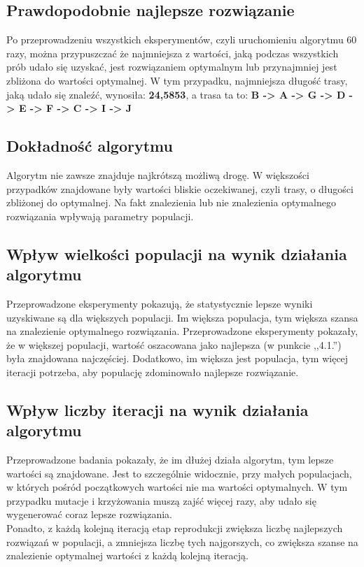 \documentclass[a4paper,11pt]{article}
\begin{document}
		\subsection{Prawdopodobnie najlepsze rozwiązanie}
		Po przeprowadzeniu wszystkich eksperymentów, czyli uruchomieniu algorytmu 60 razy, można przypuszczać że najmniejsza z wartości, jaką podczas wszystkich prób udało się uzyskać, jest rozwiązaniem optymalnym lub przynajmniej jest zbliżona do wartości optymalnej. W tym przypadku, najmniejsza długość trasy, jaką udało się znaleźć, wynosiła: \textbf{24,5853}, a trasa ta to: \textbf{B -> A -> G -> D -> E -> F -> C -> I -> J}
		\subsection{Dokładność algorytmu}
		Algorytm nie zawsze znajduje najkrótszą możliwą drogę. W większości przypadków znajdowane były wartości bliskie oczekiwanej, czyli trasy, o długości zbliżonej do optymalnej. Na fakt znalezienia lub nie znalezienia optymalnego rozwiązania wpływają parametry populacji.
		\subsection{Wpływ wielkości populacji na wynik działania algorytmu}
		Przeprowadzone eksperymenty pokazują, że statystycznie lepsze wyniki uzyskiwane są dla większych populacji. Im większa populacja, tym większa szansa na znalezienie optymalnego rozwiązania. Przeprowadzone eksperymenty pokazały, że w większej populacji, wartość oszacowana jako najlepsza (w punkcie ,,4.1.'') była znajdowana najczęściej. Dodatkowo, im większa jest populacja, tym więcej iteracji potrzeba, aby populację zdominowało najlepsze rozwiązanie.
		\subsection{Wpływ liczby iteracji na wynik działania algorytmu} 
		Przeprowadzone badania pokazały, że im dłużej działa algorytm, tym lepsze wartości są znajdowane. Jest to szczególnie widocznie, przy małych populacjach, w których pośród początkowych wartości nie ma wartości optymalnych. W tym przypadku mutacje i krzyżowania muszą zajść więcej razy, aby udało się wygenerować coraz lepsze rozwiązania. \\
		Ponadto, z każdą kolejną iteracją etap reprodukcji zwiększa liczbę najlepszych rozwiązań w populacji, a zmniejsza liczbę tych najgorszych, co zwiększa szanse na znalezienie optymalnej wartości z każdą kolejną iteracją.
\end{document}
